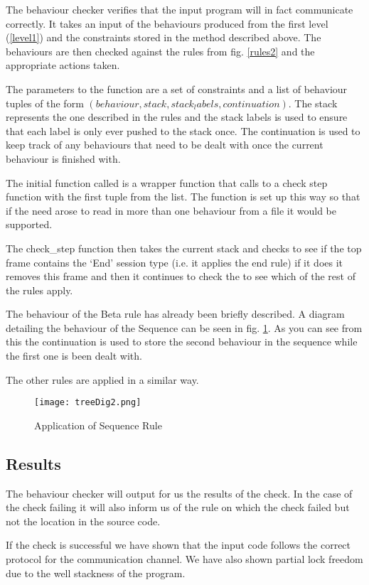 The behaviour checker verifies that the input program will in fact communicate correctly. It takes an input of the behaviours produced from the first level (\ref{level1}) and the constraints stored in the method described above. The behaviours are then checked against the rules from fig. \ref{rules2} and the appropriate actions taken. 

The parameters to the function are a set of constraints and a list of behaviour tuples of the form $(behaviour, stack, stack_labels, continuation)$. The stack represents the one described in the rules and the stack labels is used to ensure that each label is only ever pushed to the stack once. The continuation is used to keep track of any behaviours that need to be dealt with once the current behaviour is finished with. 

The initial function called is a wrapper function that calls to a check step function with the first tuple from the list. The function is set up this way so that if the need arose to read in more than one behaviour from a file it would be supported. 

The check_step function then takes the current stack and checks to see if the top frame contains the `End' session type (i.e. it applies the end rule) if it does it removes this frame and then it continues to check the to see which of the rest of the rules apply. 

The behaviour of the Beta rule has already been briefly described. A diagram detailing the behaviour of the Sequence can be seen in fig. \ref{seq}. As you can see from this the continuation is used to store the second behaviour in the sequence while the first one is been dealt with. 

The other rules are applied in a similar way. 

\begin{figure}
\texttt{[image: treeDig2.png]}
\caption{Application of Sequence Rule}
\label{seq}
\end{figure}

\subsection{Results}
The behaviour checker will output for us the results of the check. In the case of the check failing it will also inform us of the rule on which the check failed but not the location in the source code.

If the check is successful we have shown that the input code follows the correct protocol for the communication channel. We have also shown partial lock freedom due to the well stackness of the program. 

